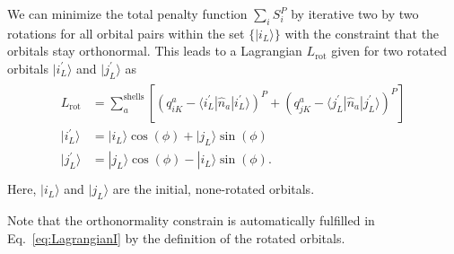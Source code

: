 We can minimize the total penalty function $\sum_i S_i^P$ by iterative two by two rotations for all orbital pairs
within the set $\{|i_L\rangle \}$ with the constraint that the orbitals stay orthonormal.
This leads to a Lagrangian $L_\mathrm{rot}$ given for two rotated orbitals $|i^{\prime}_L\rangle$
and $|j^{\prime}_L\rangle$ as
\begin{align}
  \begin{split}
    L_\mathrm{rot}&=\sum_a^\mathrm{shells}\left[
      \left(q_{iK}^a-\langle i^{\prime}_L|\hat{n}_a|i_L^{\prime}\rangle \right)^P
    + \left(q_{jK}^a-\langle j^{\prime}_L|\hat{n}_a|j_L^{\prime}\rangle\right)^P
    \right]\\
    |i_L^{\prime}\rangle &= |i_L^{}\rangle \cos(\phi)+|j_L^{}\rangle\sin(\phi)\\
    |j_L^{\prime}\rangle &= |j_L^{}\rangle \cos(\phi)-|i_L^{}\rangle\sin(\phi).\\
  \end{split}
  \label{eq:LagrangianI}
\end{align}
Here, $|i_L\rangle$ and $|j_L\rangle$ are the initial, none-rotated orbitals.

Note that the orthonormality constrain is automatically fulfilled in Eq.~\ref{eq:LagrangianI} by
the definition of the rotated orbitals.


